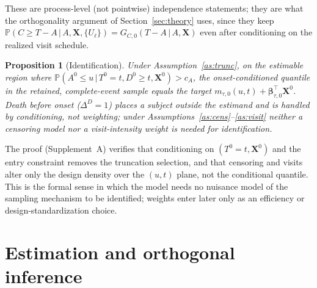 \documentclass[11pt]{article}
\newtheorem{proposition}{Proposition}
\newcommand{\PR}{\mathbb{P}}
\newcommand{\X}{\bm{X}}
\newcommand{\bbeta}{\bm{\beta}}
\newcommand{\given}{\,\vert\,}
\begin{document}
These are process-level (not pointwise) independence statements; they are what the
orthogonality argument of Section~\ref{sec:theory} uses, since they keep
$\PR(C\ge T-A\given A,\X,\{U_\ell\})=G_{C,0}(T-A\given A,\X)$ even after
conditioning on the realized visit schedule.

\begin{proposition}[Identification]\label{prop:id}
Under Assumption~\ref{as:trunc}, on the estimable region where
$\PR(A^0\le u\given T^0=t,D^0\ge t,\X^0)>c_A$, the onset-conditioned quantile in the
retained, complete-event sample equals the target $m_{\tau,0}(u,t)+\bbeta_{\tau,0}^\top\X^0$.
Death before onset ($\Delta^D=1$) places a subject outside the estimand and is
handled by conditioning, not weighting; under Assumptions~\ref{as:cens}--\ref{as:visit}
neither a censoring model nor a visit-intensity weight is needed for identification.
\end{proposition}

\noindent The proof (Supplement~A) verifies that conditioning on $(T^0=t,\X^0)$ and the
entry constraint removes the truncation selection, and that censoring and visits
alter only the design density over the $(u,t)$ plane, not the conditional quantile.
This is the formal sense in which the model needs no nuisance model of the
sampling mechanism to be identified; weights enter later only as an efficiency or
design-standardization choice.

\section{Estimation and orthogonal inference}\label{sec:est}
\end{document}
